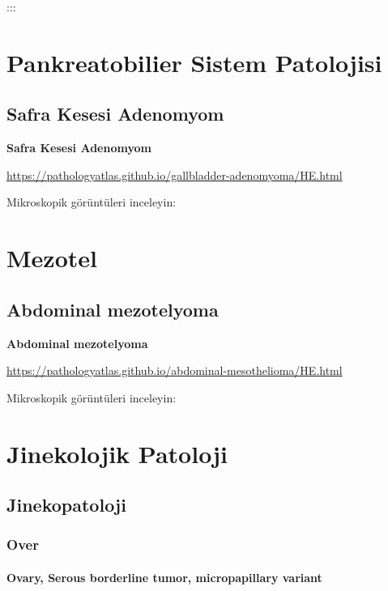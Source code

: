 \documentclass[
  letterpaper,
  DIV=11,
  numbers=noendperiod]{scrreprt}
\begin{document}
:::

\part{Pankreatobilier Sistem Patolojisi}

\hypertarget{safra-kesesi-adenomyom}{%
\chapter{Safra Kesesi Adenomyom}\label{safra-kesesi-adenomyom}}

\textbf{Safra Kesesi Adenomyom}

\url{https://pathologyatlas.github.io/gallbladder-adenomyoma/HE.html}

Mikroskopik görüntüleri inceleyin:

\part{Mezotel}

\hypertarget{abdominal-mezotelyoma}{%
\chapter{Abdominal mezotelyoma}\label{abdominal-mezotelyoma}}

\textbf{Abdominal mezotelyoma}

\url{https://pathologyatlas.github.io/abdominal-mesothelioma/HE.html}

Mikroskopik görüntüleri inceleyin:

\part{Jinekolojik Patoloji}

\hypertarget{jinekopatoloji}{%
\chapter{Jinekopatoloji}\label{jinekopatoloji}}

\hypertarget{over}{%
\section{Over}\label{over}}

\hypertarget{ovary-serous-borderline-tumor-micropapillary-variant}{%
\subsection{Ovary, Serous borderline tumor, micropapillary
variant}\label{ovary-serous-borderline-tumor-micropapillary-variant}}
\end{document}
